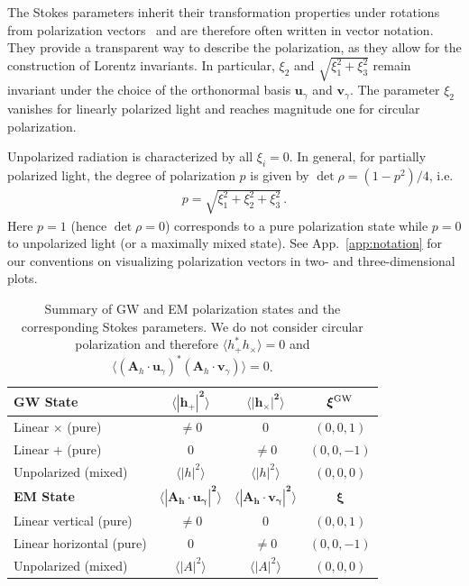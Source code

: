 \documentclass[a4paper,11pt]{article}
\begin{document}
%
The Stokes parameters inherit their transformation properties under rotations from polarization vectors~\cite{Weinberg:2008} and are therefore often written in vector notation.
%
They provide a transparent way to describe the polarization,
as they allow for the construction of Lorentz invariants. In particular, $\xi_2$ and $\sqrt{\xi_1^2 + \xi_3^2}$ remain invariant under the choice of the orthonormal basis ${\bm u}_\gamma$ and ${\bm v}_\gamma$.
%
The parameter $\xi_2$ vanishes for linearly polarized light and reaches magnitude one for circular polarization. 



Unpolarized radiation is characterized by all $\xi_i = 0$. In general, for partially polarized light, the degree of polarization $ p $ is given by $ \det \rho = (1-p^{2}) / 4$, i.e.
%
\begin{align}
    p = \sqrt{\xi_{1}^{2}+ \xi_{2}^{2}+ \xi_{3}^{2}} \,.
    \label{eq:deg_of_pol} 
\end{align}
%
Here $ p = 1 $ (hence $ \det \rho = 0 $) corresponds to a pure polarization state while $  p = 0 $ to unpolarized light (or a maximally mixed state).
%
See App.~\ref{app:notation} for our conventions on visualizing polarization vectors in two- and three-dimensional plots.



\begin{table}[t]
\centering
\setlength{\tabcolsep}{10pt}
\renewcommand{\arraystretch}{1.25}
\begin{tabular}{lccc}
\hline
\textbf{GW State} &
$\boldsymbol{\langle |h_{+}|^{2}\rangle}$ &
$\boldsymbol{\langle |h_{\times}|^{2}\rangle}$ &
\textbf{${\bm\xi}^{\rm GW}$} \\ \hline
Linear $\times$ (pure)            & $\neq 0$ & $0$                       & $(0,0,1)$ \\
Linear $+$ (pure)       & $0$      & $\neq 0$                  & $(0,0,-1)$ \\
%
Unpolarized (mixed)          & $\langle |h|^{2}\rangle$ & $\langle |h|^{2}\rangle$ & $(0,0,0)$ \\ \hline
%
\hline
\textbf{EM State} &
$\boldsymbol{\langle |{\bm A}_{h}\!\cdot{\bm u}_{\gamma}|^{2}\rangle}$ &
$\boldsymbol{\langle |{\bm A}_{h}\!\cdot{\bm v}_{\gamma}|^{2}\rangle}$ &
\textbf{${\bm\xi}$} \\ \hline
Linear vertical (pure)   & $\neq 0$ & $0$                       & $(0,0,1)$ \\
Linear horizontal (pure) & $0$      & $\neq 0$                  & $(0,0,-1)$ \\
%
Unpolarized (mixed)      & $\langle |A|^{2}\rangle$ & $\langle |A|^{2}\rangle$ & $(0,0,0)$ \\ \hline
\end{tabular}
\caption{Summary of GW and EM polarization states and the corresponding Stokes parameters. We do not consider circular polarization and therefore $\langle h_{+}^{*}h_{\times}\rangle=0$ and $\langle ({\bm A}_{h}\!\cdot{\bm u}_{\gamma})^{*} ({\bm A}_{h}\!\cdot{\bm v}_{\gamma})\rangle =0$.}
\label{table:xi}
\end{table}
\end{document}
